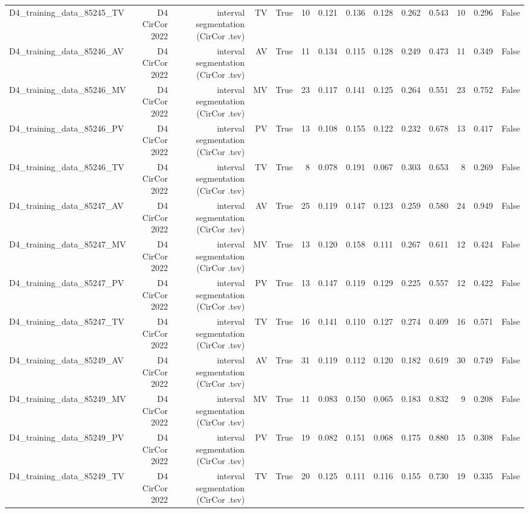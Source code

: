 \begin{table}[htbp]
\begin{tabular}{lrrrrrrrrrrrrr}
    D4\_training\_data\_85245\_TV & D4 CirCor 2022 & interval segmentation (CirCor .tsv) & TV & True & 10 & 0.121 & 0.136 & 0.128 & 0.262 & 0.543 & 10 & 0.296 & False \\
    D4\_training\_data\_85246\_AV & D4 CirCor 2022 & interval segmentation (CirCor .tsv) & AV & True & 11 & 0.134 & 0.115 & 0.128 & 0.249 & 0.473 & 11 & 0.349 & False \\
    D4\_training\_data\_85246\_MV & D4 CirCor 2022 & interval segmentation (CirCor .tsv) & MV & True & 23 & 0.117 & 0.141 & 0.125 & 0.264 & 0.551 & 23 & 0.752 & False \\
    D4\_training\_data\_85246\_PV & D4 CirCor 2022 & interval segmentation (CirCor .tsv) & PV & True & 13 & 0.108 & 0.155 & 0.122 & 0.232 & 0.678 & 13 & 0.417 & False \\
    D4\_training\_data\_85246\_TV & D4 CirCor 2022 & interval segmentation (CirCor .tsv) & TV & True & 8 & 0.078 & 0.191 & 0.067 & 0.303 & 0.653 & 8 & 0.269 & False \\
    D4\_training\_data\_85247\_AV & D4 CirCor 2022 & interval segmentation (CirCor .tsv) & AV & True & 25 & 0.119 & 0.147 & 0.123 & 0.259 & 0.580 & 24 & 0.949 & False \\
    D4\_training\_data\_85247\_MV & D4 CirCor 2022 & interval segmentation (CirCor .tsv) & MV & True & 13 & 0.120 & 0.158 & 0.111 & 0.267 & 0.611 & 12 & 0.424 & False \\
    D4\_training\_data\_85247\_PV & D4 CirCor 2022 & interval segmentation (CirCor .tsv) & PV & True & 13 & 0.147 & 0.119 & 0.129 & 0.225 & 0.557 & 12 & 0.422 & False \\
    D4\_training\_data\_85247\_TV & D4 CirCor 2022 & interval segmentation (CirCor .tsv) & TV & True & 16 & 0.141 & 0.110 & 0.127 & 0.274 & 0.409 & 16 & 0.571 & False \\
    D4\_training\_data\_85249\_AV & D4 CirCor 2022 & interval segmentation (CirCor .tsv) & AV & True & 31 & 0.119 & 0.112 & 0.120 & 0.182 & 0.619 & 30 & 0.749 & False \\
    D4\_training\_data\_85249\_MV & D4 CirCor 2022 & interval segmentation (CirCor .tsv) & MV & True & 11 & 0.083 & 0.150 & 0.065 & 0.183 & 0.832 & 9 & 0.208 & False \\
    D4\_training\_data\_85249\_PV & D4 CirCor 2022 & interval segmentation (CirCor .tsv) & PV & True & 19 & 0.082 & 0.151 & 0.068 & 0.175 & 0.880 & 15 & 0.308 & False \\
    D4\_training\_data\_85249\_TV & D4 CirCor 2022 & interval segmentation (CirCor .tsv) & TV & True & 20 & 0.125 & 0.111 & 0.116 & 0.155 & 0.730 & 19 & 0.335 & False \\

\end{tabular}
\end{table}
